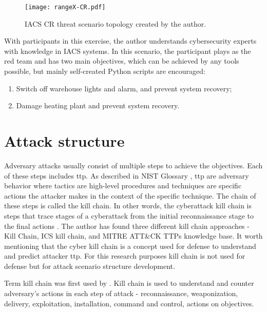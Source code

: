 \begin{figure}[htb]
	\texttt{[image: rangeX-CR.pdf]}
	\caption{IACS CR threat scenario topology created by the author.}
	\label{fig:cr-network-topology-scenario}
\end{figure}


With participants in this exercise, the author understands cybersecurity experts with knowledge in IACS systems. In this scenario, the participant plays as the red team and has two main objectives, which can be achieved by any tools possible, but mainly self-created Python scripts are encouraged:

\begin{enumerate}
	\item Switch off warehouse lights and alarm, and prevent system recovery;
	\item Damage heating plant and prevent system recovery.
\end{enumerate}

\section{Attack structure} \label{sec:attack-structure}

Adversary attacks usually consist of multiple steps to achieve the objectives. Each of these steps includes \gls*{ttp}. As described in NIST Glossary \parencite{WEB15-nist-glosary}, \gls*{ttp} are adversary behavior where tactics are high-level procedures and techniques are specific actions the attacker makes in the context of the specific technique. The chain of these steps is called the kill chain. In other words, the cyberattack kill chain is steps that trace stages of a cyberattack from the initial reconnaissance stage to the final actions \parencite{77-ics-kill-chain}. The author has found three different kill chain approaches - \citeauthor{78-kill-chain} Kill Chain, ICS kill chain, and MITRE ATT\&CK TTPs knowledge base. It worth mentioning that the cyber kill chain is a concept used for defense to understand and predict attacker \gls*{ttp}. For this research purposes kill chain is not used for defense but for attack scenario structure development.

Term kill chain was first used by \citeauthor{78-kill-chain} \parencite{78-kill-chain}. \citeauthor{78-kill-chain} Kill chain is used to understand and counter adversary's actions in each step of attack -  reconnaissance, weaponization, delivery, exploitation, installation, command and control, actions on objectives.

